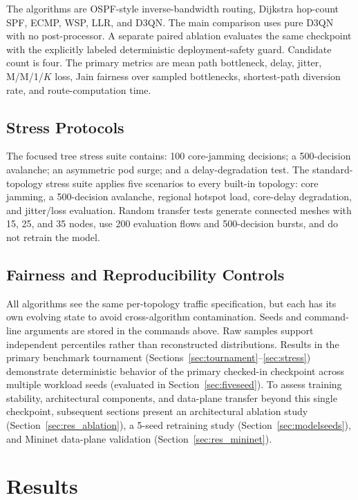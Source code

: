 \documentclass[12pt,a4paper,oneside]{report}
\begin{document}
The algorithms are OSPF-style inverse-bandwidth routing, Dijkstra hop-count SPF, ECMP, WSP, LLR, and D3QN. The main comparison uses pure D3QN with no post-processor. A separate paired ablation evaluates the same checkpoint with the explicitly labeled deterministic deployment-safety guard. Candidate count is four. The primary metrics are mean path bottleneck, delay, jitter, M/M/1/$K$ loss, Jain fairness over sampled bottlenecks, shortest-path diversion rate, and route-computation time.

\section{Stress Protocols}
The focused tree stress suite contains: 100 core-jamming decisions; a 500-decision avalanche; an asymmetric pod surge; and a delay-degradation test. The standard-topology stress suite applies five scenarios to every built-in topology: core jamming, a 500-decision avalanche, regional hotspot load, core-delay degradation, and jitter/loss evaluation. Random transfer tests generate connected meshes with 15, 25, and 35 nodes, use 200 evaluation flows and 500-decision bursts, and do not retrain the model.

\section{Fairness and Reproducibility Controls}
All algorithms see the same per-topology traffic specification, but each has its own evolving state to avoid cross-algorithm contamination. Seeds and command-line arguments are stored in the commands above. Raw samples support independent percentiles rather than reconstructed distributions. Results in the primary benchmark tournament (Sections~\ref{sec:tournament}--\ref{sec:stress}) demonstrate deterministic behavior of the primary checked-in checkpoint across multiple workload seeds (evaluated in Section~\ref{sec:fiveseed}). To assess training stability, architectural components, and data-plane transfer beyond this single checkpoint, subsequent sections present an architectural ablation study (Section~\ref{sec:res_ablation}), a 5-seed retraining study (Section~\ref{sec:modelseeds}), and Mininet data-plane validation (Section~\ref{sec:res_mininet}).

\chapter{Results}
\label{chap:results}
\end{document}
